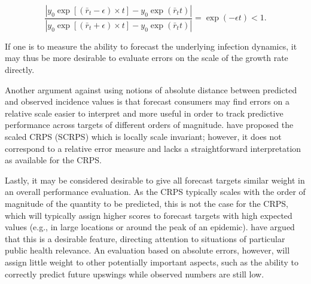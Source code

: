 \documentclass[10pt,letterpaper]{article}
\begin{document}
\begin{linenomath*}
\begin{equation}
\frac{\left|y_0 \exp[(\bar{r}_t - \epsilon) \times t] - y_0 \exp(\bar{r}_t t)\right|}{\left| y_0 \exp[(\bar{r}_t + \epsilon) \times t] - y_0 \exp(\bar{r}_t t) \right|} = \exp(-\epsilon t) < 1.
\end{equation}
\end{linenomath*}

If one is to measure the ability to forecast the underlying infection dynamics, it may thus be more desirable to evaluate errors on the scale of the growth rate directly.

Another argument against using notions of absolute distance between predicted and observed incidence values is that forecast consumers may find errors on a relative scale easier to interpret and more useful in order to track predictive performance across targets of different orders of magnitude. 
\cite{bolinLocalScaleInvariance2021} have proposed the scaled CRPS (SCRPS) which is locally scale invariant; however, it does not correspond to a relative error measure and lacks a straightforward interpretation as available for the CRPS. 

Lastly, it may be considered desirable to give all forecast targets similar weight in an overall performance evaluation. As the CRPS typically scales with the order of magnitude of the quantity to be predicted, this is not the case for the CRPS, which will typically assign higher scores to forecast targets with high expected values (e.g., in large locations or around the peak of an epidemic). \cite{bracherEvaluatingEpidemicForecasts2021} have argued that this is a desirable feature, directing attention to situations of particular public health relevance. An evaluation based on absolute errors, however, will assign little weight to other potentially important aspects, such as the ability to correctly predict future upswings while observed numbers are still low. 
\end{document}
